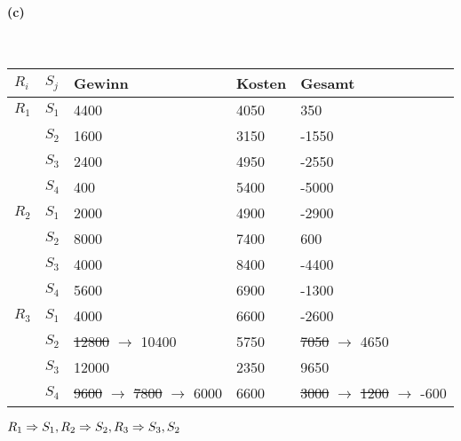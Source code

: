 \documentclass[11pt,a4paper,parskip=half ]{scrartcl}
\begin{document}
	\paragraph{(c)}~
	\begin{table}[h]
		\begin{tabular}{l|l|l|l|l}
			$R_{i}$	& $S_{j}$ & Gewinn & Kosten & Gesamt 		\\ \hline \hline
			$R_{1}$ & $S_{1}$ & 4400   & 4050   & 350          	\\
					& $S_{2}$ & 1600   & 3150   & -1550        	\\
					& $S_{3}$ & 2400   & 4950   & -2550	       	\\
					& $S_{4}$ & 400    & 5400   & -5000        	\\ \hline
			$R_{2}$ & $S_{1}$ & 2000   & 4900   & -2900        	\\
					& $S_{2}$ & 8000   & 7400   & 600          	\\
					& $S_{3}$ & 4000   & 8400   & -4400        	\\
					& $S_{4}$ & 5600   & 6900   & -1300        	\\ \hline
			$R_{3}$ & $S_{1}$ & 4000   & 6600   & -2600        	\\
					& $S_{2}$ & \st{12800} $\rightarrow$ 10400  & 5750   & \st{7050} $\rightarrow$ 4650         \\
					& $S_{3}$ & 12000  & 2350   & 9650          \\
					& $S_{4}$ & \st{9600} $\rightarrow$ \st{7800} $\rightarrow$ 6000   & 6600   & \st{3000} $\rightarrow$ \st{1200} $\rightarrow$ -600        
		\end{tabular}
	\end{table}
	
	$R_{1}\Rightarrow S_{1},\\
	R_{2}\Rightarrow S_{2},\\
	R_{3}\Rightarrow S_{3},S_{2}$
	
\end{document}
